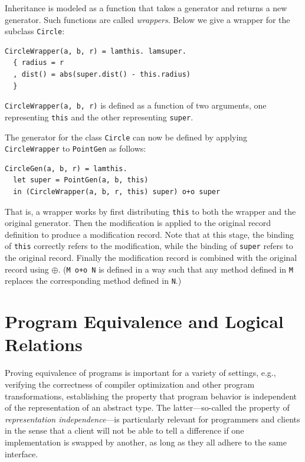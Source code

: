 Inheritance is modeled as a function that takes a generator and returns a new
generator. Such functions are called \textit{wrappers}. Below we give a wrapper
for the subclass \lstinline{Circle}:
\begin{lstlisting}[language=simple]
CircleWrapper(a, b, r) = lamthis. lamsuper.
  { radius = r
  , dist() = abs(super.dist() - this.radius)
  }
\end{lstlisting}
\lstinline{CircleWrapper(a, b, r)} is defined as a function of two arguments,
one representing \lstinline{this} and the other representing \lstinline{super}.

The generator for the class \lstinline{Circle} can now be defined by
applying \lstinline{CircleWrapper} to \lstinline{PointGen} as follows:
\begin{lstlisting}[language=simple]
CircleGen(a, b, r) = lamthis.
  let super = PointGen(a, b, this)
  in (CircleWrapper(a, b, r, this) super) o+o super
\end{lstlisting}
That is, a wrapper works by first distributing \lstinline{this} to both the
wrapper and the original generator. Then the modification is applied to the
original record definition to produce a modification record. Note that at this
stage, the binding of \lstinline{this} correctly refers to the modification,
while the binding of \lstinline{super} refers to the original record. Finally
the modification record is combined with the original record using $\oplus$.
(\lstinline{M o+o N} is defined in a way such that any method defined in \lstinline{M}
replaces the corresponding method defined in \lstinline{N}.)


\section{Program Equivalence and Logical Relations}

\label{sec:bg:lr}


Proving equivalence of programs is important for a variety of settings, e.g.,
verifying the correctness of compiler optimization and other program
transformations, establishing the property that program behavior is independent
of the representation of an abstract type. The latter---so-called the property of
\textit{representation independence}---is particularly relevant for programmers
and clients in the sense that a client will not be able to tell a difference if
one implementation is swapped by another, as long as they all adhere to the same
interface.

